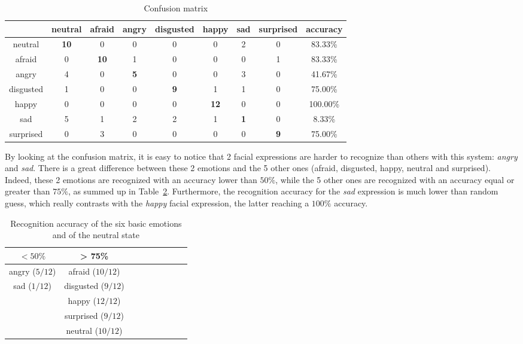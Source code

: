 \begin{table}[h]
\begin{center}
   \caption{\label{table_results_confusion_matrix} Confusion matrix}
\begin{tabular}{|c|c|c|c|c|c|c|c|c|}
  \hline
   & neutral & afraid & angry & disgusted & happy & sad & surprised & accuracy \\
  \hline
  neutral & \textbf{10} & 0 & 0 & 0 & 0 & 2 & 0 & 83.33\% \\
  afraid & 0 & \textbf{10} & 1 & 0 & 0 & 0 & 1 & 83.33\% \\
  angry & 4 & 0 & \textbf{5} & 0 & 0 & 3 & 0 & 41.67\% \\
  disgusted & 1 & 0 & 0 & \textbf{9} & 1 & 1 & 0 & 75.00\% \\
  happy & 0 & 0 & 0 & 0 & \textbf{12} & 0 & 0 & 100.00\% \\
  sad & 5 & 1 & 2 & 2 & 1 & \textbf{1} & 0 & 8.33\% \\
  surprised & 0 & 3 & 0 & 0 & 0 & 0 & \textbf{9} & 75.00\%\\
  \hline
\end{tabular}
\end{center}
\end{table}

\noindent By looking at the confusion matrix, it is easy to notice that 2 facial expressions are harder to recognize than others with this system: \textit{angry} and \textit{sad}. There is a great difference between these 2 emotions and the 5 other ones (afraid, disgusted, happy, neutral and surprised). Indeed, these 2 emotions are recognized with an accuracy lower than $ 50\% $, while the 5 other ones are recognized with an accuracy equal or greater than $ 75\% $, as summed up in Table~\ref{table_results_accuracy}. Furthermore, the recognition accuracy for the \textit{sad} expression is much lower than random guess, which really contrasts with the \textit{happy} facial expression, the latter reaching a $100\%$ accuracy.
\newline

\begin{table}[h]
\begin{center}
   \caption{\label{table_results_accuracy} Recognition accuracy of the six basic emotions and of the neutral state}
\begin{tabular}{|c|c|c|c|c|c|c|c|c|}
  \hline
   $ < 50\% $ & > 75\% \\
  \hline
  angry ($ 5/12 $) & afraid ($ 10/12 $) \\
  sad ($ 1/12 $) & disgusted ($ 9/12 $) \\
   & happy ($ 12/12 $) \\
   & surprised ($ 9/12 $) \\
   & neutral ($ 10/12 $) \\
  \hline
\end{tabular}
\end{center} 
\end{table}


